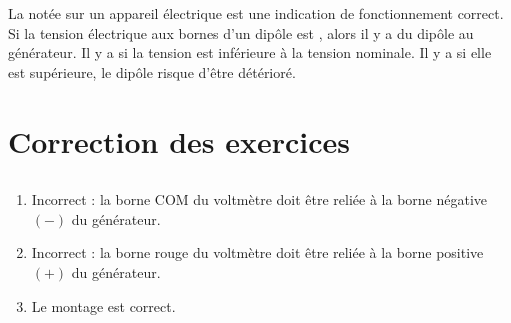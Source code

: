 \documentclass[12pt,a4paper]{article}
\begin{document}
\begin{mybilan}
	La  notée sur un appareil électrique est une indication de fonctionnement correct.
	Si la tension électrique aux bornes d'un dipôle est , alors il y a  du dipôle au générateur. 
	Il y a  si la tension est inférieure à la tension nominale. Il y a  si elle est supérieure, le dipôle risque d'être détérioré. 
\end{mybilan}

\begin{myex}
\end{myex}
\appendix

\newpage

\section*{Correction des exercices}

\subsection*{}


\subsection*{}


	\begin{enumerate}
		\item Incorrect : la borne COM du voltmètre doit être reliée à la borne négative $(-)$ du générateur.
		\item Incorrect : la borne rouge du voltmètre doit être reliée à la borne positive $(+)$ du générateur.
		\item Le montage est correct.
	\end{enumerate}
\end{document}
